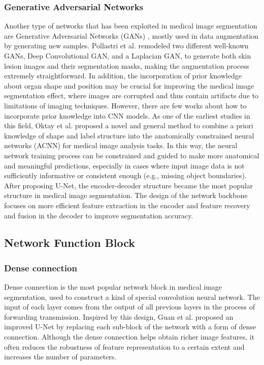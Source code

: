 \subsubsection{Generative Adversarial Networks}
\label{subsubsec:gan}
Another type of networks that has been exploited in medical image segmentation
are Generative Adversarial Networks (GANs) \cite{goodfellow2020gan}, mostly used
in data augmentation by generating new samples. Pollastri et al.
\cite{pollastri2020gan} remodeled two different well-known GANs, Deep
Convolutional GAN, and a Laplacian GAN, to generate both skin lesion images and
their segmentation masks, making the augmentation process extremely
straightforward.
In addition, the incorporation of prior knowledge about
organ shape and position may be crucial for improving the medical
image segmentation effect, where images are corrupted and
thus contain artifacts due to limitations of imaging techniques.
However, there are few works about how to incorporate prior
knowledge into CNN models. As one of the earliest studies in this field, Oktay et al. proposed a novel and general
method to combine a priori knowledge of shape and label
structure into the anatomically constrained neural networks
(ACNN) for medical image analysis tasks. In this way, the neural network training process can be constrained and guided to
make more anatomical and meaningful predictions, especially
in cases where input image data is not sufficiently informative or consistent enough (e.g., missing object boundaries).\\

After proposing U-Net, the encoder-decoder structure
became the most popular structure in medical image segmentation. The design of the network backbone focuses on more
efficient feature extraction in the encoder and feature recovery
and fusion in the decoder to improve segmentation accuracy.

\subsection{Network Function Block}
\subsubsection{Dense connection}
Dense connection is the most popular network block in medical image
segmentation, used to construct a kind of special convolution neural network. The
input of each layer comes from the output of all previous layers in the process of forwarding transmission. Inspired by this design, Guan et al. proposed an
improved U-Net by replacing each sub-block of the network with a form of dense
connection. Although the dense connection helps obtain richer image
features, it often reduces the robustness of feature representation to a certain
extent and increases the number of parameters.

